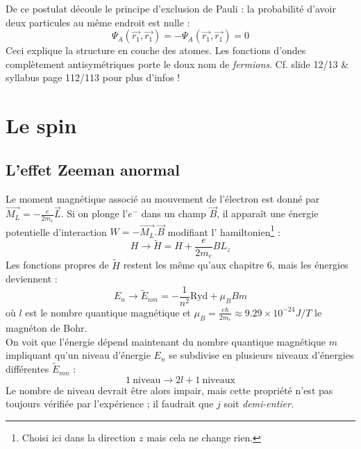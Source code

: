 \documentclass	[11pt, a4paper, openany]{book}
\begin{document}
	De ce postulat découle le principe d'exclusion de Pauli : la probabilité d'avoir deux particules au même endroit est nulle :
	\begin{equation}
		\Psi_A(\vec{r_1},\vec{r_1}) = -\Psi_A(\vec{r_1},\vec{r_1}) = 0
	\end{equation}
	Ceci explique la structure en couche des atomes. Les fonctions d'ondes complètement antisymétriques porte le doux nom de \textit{fermions}. Cf. slide 12/13 \& syllabus page 112/113 pour plus d'infos !
	
	
	
	\chapter{Le spin}
	\section{L'effet Zeeman anormal}
	Le moment magnétique associé au mouvement de l'électron est donné par $\vec{M_L} = 
	-\frac{e}{2m_e}\vec{L}$. Si on plonge l'$e^-$ dans un champ $\vec{B}$, il apparaît
	une énergie potentielle d'interaction $W = -\vec{M_L}.\vec{B}$ modifiant l'
	hamiltonien\footnote{Choisi ici dans la direction $z$ mais cela ne change rien.} :
	\begin{equation}
		H \rightarrow \tilde{H} = H + \frac{e}{2m_e}BL_z
	\end{equation}
	Les fonctions propres de $\tilde{H}$ restent les même qu'aux chapitre 6, mais les 
	énergies deviennent :
	\begin{equation}
		E_n \rightarrow \tilde{E}_{nm} = -\frac{1}{n^2}\text{Ryd} + \mu_BBm
	\end{equation}
	où $l$ est le nombre quantique magnétique et $\mu_B = \frac{e\hbar}{2m_e} \approx
	9.29\times 10^{-24} J/T$ le magnéton de Bohr.\\
	On voit que l'énergie dépend maintenant du nombre quantique magnétique $m$ impliquant
	qu'un niveau d'énergie $E_n$ se subdivise en plusieurs niveaux d'énergies différentes
	$\tilde{E}_{mn}$ :
	\begin{equation}
		1\ \text{niveau} \rightarrow 2l + 1\ \text{niveaux}
	\end{equation}
	Le nombre de niveau devrait être alors impair, mais cette propriété n'est pas toujours
	vérifiée par l'expérience ; il faudrait que $j$ soit \textit{demi-entier.}
		
\end{document}
